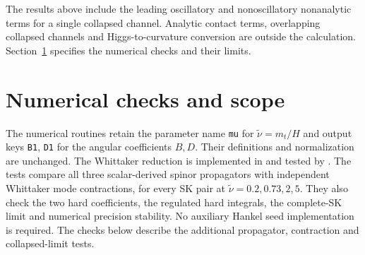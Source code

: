 \documentclass[a4paper,12pt]{article}
\newcommand{\tn}{\tilde\nu}
\begin{document}
The results above include the leading oscillatory and nonoscillatory
nonanalytic terms for a single collapsed channel. Analytic contact terms,
overlapping collapsed channels and Higgs-to-curvature conversion are
outside the calculation. Section~\ref{sec:checks} specifies the numerical
checks and their limits.

\section{Numerical checks and scope}
\label{sec:checks}
The numerical routines retain the parameter name \texttt{mu} for
$\tn=m_t/H$ and output keys \texttt{B1}, \texttt{D1} for the angular
coefficients $B,D$. Their definitions and normalization are unchanged.
The Whittaker reduction is implemented in
 and tested by
.
The tests compare all three scalar-derived spinor propagators with
independent Whittaker mode contractions, for every SK pair at
$\tn=0.2,0.73,2,5$. They also check the two hard coefficients,
the regulated hard integrals, the complete-SK limit and numerical
precision stability.
No auxiliary Hankel seed implementation is required. The checks below
describe the additional propagator, contraction and collapsed-limit tests.
\end{document}
